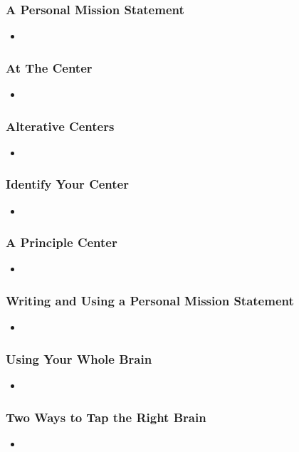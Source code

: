 \documentclass[11pt]{article}
\begin{document}
\subsubsection{A Personal Mission Statement}
\begin{itemize}
\item 
\end{itemize}
\subsubsection{At The Center}
\begin{itemize}
\item 
\end{itemize}
\subsubsection{Alterative Centers}
\begin{itemize}
\item 
\end{itemize}
\subsubsection{Identify Your Center}
\begin{itemize}
\item 
\end{itemize}
\subsubsection{A Principle Center}
\begin{itemize}
\item 
\end{itemize}
\subsubsection{Writing and Using a Personal Mission Statement}
\begin{itemize}
\item 
\end{itemize}
\subsubsection{Using Your Whole Brain}
\begin{itemize}
\item 
\end{itemize}
\subsubsection{Two Ways to Tap the Right Brain}
\begin{itemize}
\item 
\end{itemize}
\end{document}
